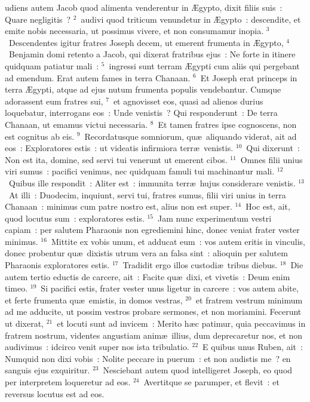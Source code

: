 \bchapter
{}udiens autem Jacob quod alimenta venderentur in \AE gypto, dixit filiis suis~: Quare negligitis~?
${}^{2}$~audivi quod triticum venundetur in \AE gypto~: descendite, et emite nobis necessaria, ut possimus vivere, et non consumamur inopia.
${}^{3}$~Descendentes igitur fratres Joseph decem, ut emerent frumenta in \AE gypto,
${}^{4}$~Benjamin domi retento a Jacob, qui dixerat fratribus ejus~: Ne forte in itinere quidquam patiatur mali~:
${}^{5}$~ingressi sunt terram \AE gypti cum aliis qui pergebant ad emendum. Erat autem fames in terra Chanaan.
${}^{6}$~Et Joseph erat princeps in terra \AE gypti, atque ad ejus nutum frumenta populis vendebantur. Cumque adorassent eum fratres sui,
${}^{7}$~et agnovisset eos, quasi ad alienos durius loquebatur, interrogans eos~: Unde venistis~? Qui responderunt~: De terra Chanaan, ut emamus victui necessaria.
${}^{8}$~Et tamen fratres ipse cognoscens, non est cognitus ab eis.
${}^{9}$~Recordatusque somniorum, qu\ae\ aliquando viderat, ait ad eos~: Exploratores estis~: ut videatis infirmiora terr\ae\ venistis.
${}^{10}$~Qui dixerunt~: Non est ita, domine, sed servi tui venerunt ut emerent cibos.
${}^{11}$~Omnes filii unius viri sumus~: pacifici venimus, nec quidquam famuli tui machinantur mali.
${}^{12}$~Quibus ille respondit~: Aliter est~: immunita terr\ae\ hujus considerare venistis.
${}^{13}$~At illi~: Duodecim, inquiunt, servi tui, fratres sumus, filii viri unius in terra Chanaan~: minimus cum patre nostro est, alius non est super.
${}^{14}$~Hoc est, ait, quod locutus sum~: exploratores estis.
${}^{15}$~Jam nunc experimentum vestri capiam~: per salutem Pharaonis non egrediemini hinc, donec veniat frater vester minimus.
${}^{16}$~Mittite ex vobis unum, et adducat eum~: vos autem eritis in vinculis, donec probentur qu\ae\ dixistis utrum vera an falsa sint~: alioquin per salutem Pharaonis exploratores estis.
${}^{17}$~Tradidit ergo illos custodi\ae\ tribus diebus.
${}^{18}$~Die autem tertio eductis de carcere, ait~: Facite qu\ae\ dixi, et vivetis~: Deum enim timeo.
${}^{19}$~Si pacifici estis, frater vester unus ligetur in carcere~: vos autem abite, et ferte frumenta qu\ae\ emistis, in domos vestras,
${}^{20}$~et fratrem vestrum minimum ad me adducite, ut possim vestros probare sermones, et non moriamini. Fecerunt ut dixerat,
${}^{21}$~et locuti sunt ad invicem~: Merito h\ae c patimur, quia peccavimus in fratrem nostrum, videntes angustiam anim\ae\ illius, dum deprecaretur nos, et non audivimus~: idcirco venit super nos ista tribulatio.
${}^{22}$~E quibus unus Ruben, ait~: Numquid non dixi vobis~: Nolite peccare in puerum~: et non audistis me~? en sanguis ejus exquiritur.
${}^{23}$~Nesciebant autem quod intelligeret Joseph, eo quod per interpretem loqueretur ad eos.
${}^{24}$~Avertitque se parumper, et flevit~: et reversus locutus est ad eos.


